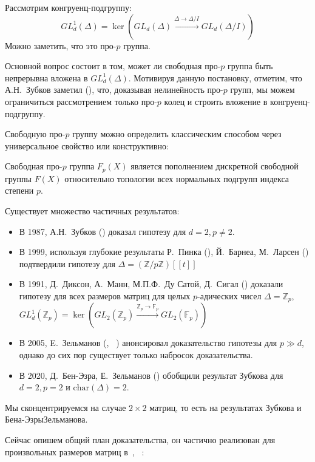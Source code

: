 Рассмотрим конгруенц-подгруппу:
\[
    GL_d^1(\Delta) = \ker\left( GL_d(\Delta) \xrightarrow{\Delta\to\Delta/I} GL_d(\Delta/I) \right)
\]
Можно заметить, что это про-$p$ группа.


Основной вопрос состоит в том, может ли свободная про-$p$ группа быть непрерывна вложена в $GL_d^1(\Delta)$.
Мотивируя данную постановку, отметим, что А.Н.\ Зубков заметил (\cite{Zubkov}), что, доказывая нелинейность про-$p$ групп, мы можем ограничиться рассмотрением только про-$p$ колец и строить вложение в конгруенц-подгруппу.

Свободную про-$p$ группу можно определить классическим способом через универсальное свойство или конструктивно:

\vskip 0.1in\noindent
\begin{definition}
    Свободная про-$p$ группа $F_p(X)$ является пополнением дискретной свободной группы $F(X)$ относительно топологии всех нормальных подгрупп индекса степени $p$.
\end{definition}
\vskip 0.1in\noindent

Существует множество частичных результатов:
\begin{itemize}
    \item В 1987, А.Н.\ Зубков (\cite{Zubkov}) доказал гипотезу для $d=2, p\neq2$.
    \item В 1999, используя глубокие результаты Р.\ Пинка (\cite{Pink}), Й.\ Барнеа, М.\ Ларсен (\cite{Barnea-Larsen}) подтвердили гипотезу для $\Delta=\left( \mathbb{Z}/p\mathbb{Z} \right)[[t]]$
    \item В 1991, Д.\ Диксон, А.\ Манн, М.П.Ф.\ Ду Сатой, Д.\ Сигал (\cite{DMSD}) доказали гипотезу для всех размеров матриц для целых $p$-адических чисел $\Delta=\mathbb{Z}_p$, $GL_d^1(\mathbb{Z}_p)=\ker\left( GL_2(\mathbb{Z}_p) \xrightarrow{\mathbb{Z}_p\to\mathbb{F}_p} GL_2(\mathbb{F}_p) \right)$
    \item В 2005, E.\ Зельманов (\cite{Zelmanov1}, ~\cite{Zelmanov2}) анонсировал доказательство гипотезы для $p\gg d$, однако до сих пор существует только набросок доказательства.
    \item В 2020, Д.\ Бен-Эзра, Е.\ Зельманов (\cite{Ben-Ezra-Zelmanov}) обобщили результат Зубкова для $d=2, p=2$ и $\mathrm{char}(\Delta)=2$.
\end{itemize}

Мы сконцентрируемся на случае $2\times 2$ матриц, то есть на результатах Зубкова и Бена-Эзры\textemdash Зельманова.

Сейчас опишем общий план доказательства, он частично реализован для произвольных размеров матриц в\ \cite{Zelmanov1}, ~\cite{Zelmanov2}:

